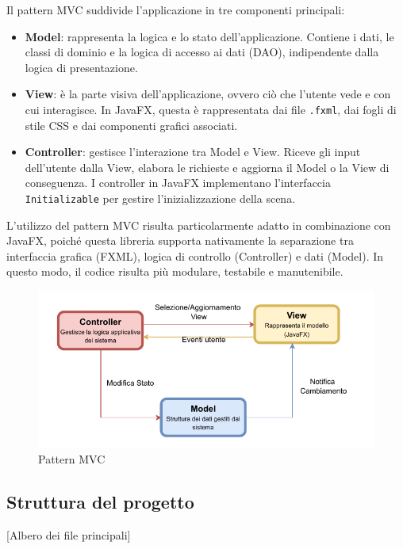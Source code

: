 \documentclass[a4paper]{article}
\begin{document}
Il pattern MVC suddivide l'applicazione in tre componenti principali:

\begin{itemize}
    \item \textbf{Model}: rappresenta la logica e lo stato dell’applicazione. Contiene i dati, le classi di dominio e la logica di accesso ai dati (DAO), indipendente dalla logica di presentazione.

    \item \textbf{View}: è la parte visiva dell’applicazione, ovvero ciò che l’utente vede e con cui interagisce. In JavaFX, questa è rappresentata dai file \texttt{.fxml}, dai fogli di stile CSS e dai componenti grafici associati.

    \item \textbf{Controller}: gestisce l’interazione tra Model e View. Riceve gli input dell’utente dalla View, elabora le richieste e aggiorna il Model o la View di conseguenza. I controller in JavaFX implementano l’interfaccia \texttt{Initializable} per gestire l’inizializzazione della scena.
\end{itemize}

\skip

L'utilizzo del pattern MVC risulta particolarmente adatto in combinazione con JavaFX, poiché questa libreria supporta nativamente la separazione tra interfaccia grafica (FXML), logica di controllo (Controller) e dati (Model). In questo modo, il codice risulta più modulare, testabile e manutenibile.

\begin{figure}[H]
    \centering
    \includegraphics[width=0.7 \textwidth]{./figures/mvc_template}
    \caption{Pattern MVC}
    \label{fig:mvc_template}
\end{figure}

\subsection{Struttura del progetto}
[Albero dei file principali]

\end{document}
